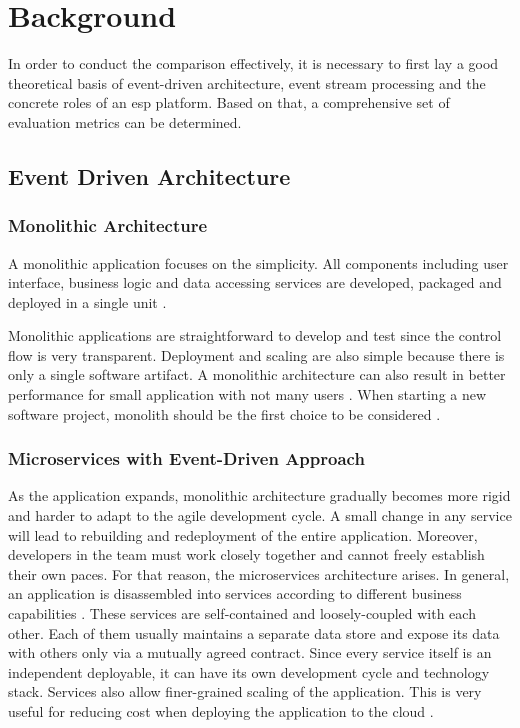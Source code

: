 \chapter{Background} \label{chap:background}
In order to conduct the comparison effectively, it is necessary to first lay a good theoretical basis of event-driven architecture, event stream processing and the concrete roles of an \acrshort{esp} platform. Based on that, a comprehensive set of evaluation metrics can be determined.


\section{Event Driven Architecture} \label{section:eventdriven}
\subsection{Monolithic Architecture}
A monolithic application focuses on the simplicity. All components including user interface, business logic and data accessing services are developed, packaged and deployed in a single unit \cite{monolith}.

Monolithic applications are straightforward to develop and test since the control flow is very transparent. Deployment and scaling are also simple because there is only a single software artifact. A monolithic architecture can also result in better performance for small application with not many users \cite{al2018comparative}. When starting a new software project, monolith should be the first choice to be considered \cite{monolithfirst}. 

\subsection{Microservices with Event-Driven Approach}
As the application expands, monolithic architecture gradually becomes more rigid and harder to adapt to the agile development cycle. A small change in any service will lead to rebuilding and redeployment of the entire application. Moreover, developers in the team must work closely together and cannot freely establish their own paces. For that reason, the microservices architecture arises. In general, an application is disassembled into services according to different business capabilities \cite{microservicesfowler}. These services are self-contained and loosely-coupled with each other. Each of them usually maintains a separate data store and expose its data with others only via a mutually agreed contract. Since every service itself is an independent deployable, it can have its own development cycle and technology stack. Services also allow finer-grained scaling of the application. This is very useful for reducing cost when deploying the application to the cloud \cite{villamizar2016infrastructure}.


